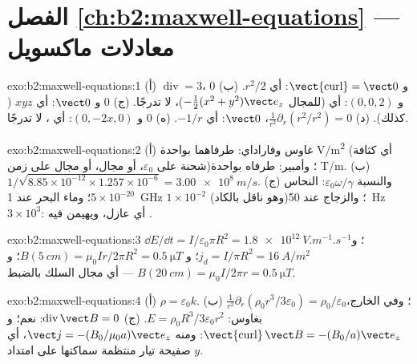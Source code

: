 \section*{الفصل \ref{ch:b2:maxwell-equations} --- معادلات ماكسويل}

\begin{solution}{exo:b2:maxwell-equations:1}
(أ) $\operatorname{div} = 3$، و $\operatorname{\vect{curl}} = \vect 0$: أي  $r^2/2$.
(ب) $0$ و $(0, 0, 2)$: أي  (للمجال $-\tfrac12(x^2 + y^2)\vect e_z$)، لا
تدرجًا. (ج) $0$ و $\vect 0$: أي  $xyz$ ( كذلك). (د)
$\frac1{r^2}\partial_r(r^2/r^2) = 0$،  $\vect 0$: أي  $-1/r$. (ه)
$0$ و $(0, -2x, 0)$: أي ، لا تدرجًا.
\end{solution}

\begin{solution}{exo:b2:maxwell-equations:2}
(أ) غاوس وفاراداي: طرفاهما بواحدة \unit{V/m^2} (أي كثافة شحنة على
$\varepsilon_0$، أو  مجال، أو مجال على زمن)؛ وأمبير: طرفاه بواحدة
\unit{T/m}.
(ب) $1/\sqrt{8.85 \times 10^{-12} \times 1.257 \times 10^{-6}} = \qty{3.00e8}{m/s}$. (ج) والنسبة
$\varepsilon_0\omega/\gamma$: النحاس $5 \times 10^{-20}$؛ وماء البحر عند \qty{1}{GHz} $1 \times 10^{-2}$
(وهو ناقل بالكاد)؛ والزجاج عند \qty{50}{Hz} $3 \times 10^3$: أي عازل،
ويهيمن فيه .
\end{solution}

\begin{solution}{exo:b2:maxwell-equations:3}
$\dd E/\dd t = I/\varepsilon_0\pi R^2 = \qty{1.8e12}{V.m^{-1}.s^{-1}}$؛ و $j_d = I/\pi R^2 =
\qty{16}{A/m^2}$؛ و $B(\qty{5}{cm}) = \mu_0Ir/2\pi R^2 = \qty{0.5}{\micro T}$؛ و $B(\qty{20}{cm}) =
\mu_0I/2\pi r = \qty{0.5}{\micro T}$ --- أي مجال السلك بالضبط.
\end{solution}

\begin{solution}{exo:b2:maxwell-equations:4}
(أ) $\rho = \varepsilon_0k$. (ب) $\frac1{r^2}\partial_r(\rho_0r^3/3\varepsilon_0) = \rho_0/\varepsilon_0$؛
وفي الخارج، بغاوس: $E = \rho_0R^3/3\varepsilon_0r^2$. (ج) $\operatorname{div}\vect B = 0$: نعم؛
و $\operatorname{\vect{curl}}\vect B = -(B_0/a)\vect e_z$: ومنه $\vect j = -(B_0/\mu_0a)\vect e_z$، أي
صفيحة تيار منتظمة سماكتها على امتداد $y$.
\end{solution}

